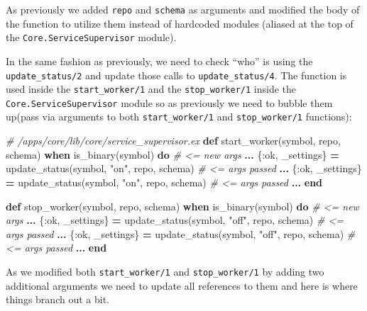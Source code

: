 \documentclass[
  oneside]{book}
\newenvironment{Shaded}{\begin{snugshade}}{\end{snugshade}}
\newcommand{\CommentTok}[1]{\textcolor[rgb]{0.56,0.35,0.01}{\textit{#1}}}
\newcommand{\KeywordTok}[1]{\textcolor[rgb]{0.13,0.29,0.53}{\textbf{#1}}}
\newcommand{\NormalTok}[1]{#1}
\newcommand{\OperatorTok}[1]{\textcolor[rgb]{0.81,0.36,0.00}{\textbf{#1}}}
\newcommand{\StringTok}[1]{\textcolor[rgb]{0.31,0.60,0.02}{#1}}
\newcommand{\VariableTok}[1]{\textcolor[rgb]{0.00,0.00,0.00}{#1}}
\begin{document}
As previously we added \texttt{repo} and \texttt{schema} as arguments and modified the body of the function to utilize them instead of hardcoded modules (aliased at the top of the \texttt{Core.ServiceSupervisor} module).

In the same fashion as previously, we need to check ``who'' is using the \texttt{update\_status/2} and update those calls to \texttt{update\_status/4}. The function is used inside the \texttt{start\_worker/1} and the \texttt{stop\_worker/1} inside the \texttt{Core.ServiceSupervisor} module so as previously we need to bubble them up(pass via arguments to both \texttt{start\_worker/1} and \texttt{stop\_worker/1} functions):

\begin{Shaded}
\begin{Highlighting}[]
  \CommentTok{\# /apps/core/lib/core/service\_supervisor.ex}
  \KeywordTok{def}\NormalTok{ start\_worker(symbol, repo, schema) }\KeywordTok{when}\NormalTok{ is\_binary(symbol) }\KeywordTok{do} \CommentTok{\# \textless{}= new args}
    \OperatorTok{...}
\NormalTok{        \{}\VariableTok{:ok}\NormalTok{, \_settings\} }\OperatorTok{=}\NormalTok{ update\_status(symbol, }\StringTok{"on"}\NormalTok{, repo, schema) }\CommentTok{\# \textless{}= args passed}
    \OperatorTok{...}
\NormalTok{        \{}\VariableTok{:ok}\NormalTok{, \_settings\} }\OperatorTok{=}\NormalTok{ update\_status(symbol, }\StringTok{"on"}\NormalTok{, repo, schema) }\CommentTok{\# \textless{}= args passed}
    \OperatorTok{...}
  \KeywordTok{end}

  \KeywordTok{def}\NormalTok{ stop\_worker(symbol, repo, schema) }\KeywordTok{when}\NormalTok{ is\_binary(symbol) }\KeywordTok{do} \CommentTok{\# \textless{}= new args}
    \OperatorTok{...}
\NormalTok{        \{}\VariableTok{:ok}\NormalTok{, \_settings\} }\OperatorTok{=}\NormalTok{ update\_status(symbol, }\StringTok{"off"}\NormalTok{, repo, schema) }\CommentTok{\# \textless{}= args passed}
    \OperatorTok{...}
\NormalTok{        \{}\VariableTok{:ok}\NormalTok{, \_settings\} }\OperatorTok{=}\NormalTok{ update\_status(symbol, }\StringTok{"off"}\NormalTok{, repo, schema) }\CommentTok{\# \textless{}= args passed}
    \OperatorTok{...}
  \KeywordTok{end}
\end{Highlighting}
\end{Shaded}

As we modified both \texttt{start\_worker/1} and \texttt{stop\_worker/1} by adding two additional arguments we need to update all references to them and here is where things branch out a bit.
\end{document}

